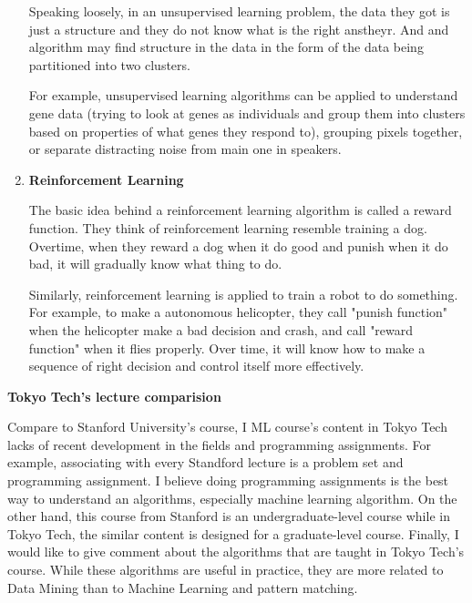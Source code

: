 \documentclass[12pt,twoside]{article}
\begin{document}
\begin{enumerate}
Speaking loosely, in an unsupervised learning problem, the data they got is just a structure and they do not know what is the right anstheyr. And and algorithm may find structure in the data in the form of the data being partitioned into two clusters.

For example, unsupervised learning algorithms can be applied to understand gene data (trying to look at genes as individuals and group them into clusters based on properties of what genes they respond to), grouping pixels together, or separate distracting noise from main one in speakers.
 
\item \textbf{Reinforcement Learning}

The basic idea behind a reinforcement learning algorithm is called a reward function. They think of reinforcement learning resemble training a dog. Overtime, when they reward a dog when it do good and punish when it do bad, it will gradually know what thing to do.

Similarly, reinforcement learning is applied to train a robot to do something. For example, to make a autonomous helicopter, they call "punish function" when the helicopter make a bad decision and crash, and call "reward function" when it flies properly. Over time, it will know how to make a sequence of right decision and control itself more effectively.

\end{enumerate}

\begin{center}
\textbf{Tokyo Tech's lecture comparision}
\end{center}

Compare to Stanford University's course, I ML course's content in Tokyo Tech lacks of recent development in the fields and programming assignments. For example, associating with every Standford lecture is a problem set and programming assignment. I believe doing programming assignments is the best way to understand an algorithms, especially machine learning algorithm. On the other hand, this course from Stanford is an undergraduate-level course while in Tokyo Tech, the similar content is designed for a graduate-level course. Finally, I would like to give comment about the algorithms that are taught in Tokyo Tech's course. While these algorithms are useful in practice, they are more related to Data Mining than to Machine Learning and pattern matching.
\end{document}
